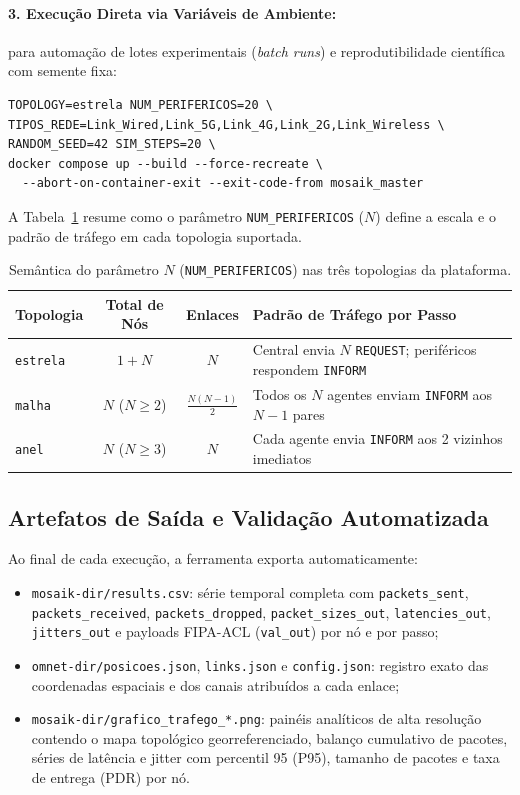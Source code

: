 \documentclass[10pt,twocolumn,a4paper]{article}
\begin{document}
\paragraph{3. Execução Direta via Variáveis de Ambiente:} para automação de lotes experimentais (\textit{batch runs}) e reprodutibilidade científica com semente fixa:
\begin{lstlisting}[style=shellstyle]
TOPOLOGY=estrela NUM_PERIFERICOS=20 \
TIPOS_REDE=Link_Wired,Link_5G,Link_4G,Link_2G,Link_Wireless \
RANDOM_SEED=42 SIM_STEPS=20 \
docker compose up --build --force-recreate \
  --abort-on-container-exit --exit-code-from mosaik_master
\end{lstlisting}

A Tabela~\ref{tab:semantica_topologias} resume como o parâmetro \texttt{NUM\_PERIFERICOS} ($N$) define a escala e o padrão de tráfego em cada topologia suportada.

\begin{table}[H]
\centering
\caption{Semântica do parâmetro $N$ (\texttt{NUM\_PERIFERICOS}) nas três topologias da plataforma.}
\label{tab:semantica_topologias}
\scriptsize
\begin{tabularx}{\columnwidth}{@{}lccp{3.3cm}@{}}
\toprule
\textbf{Topologia} & \textbf{Total de Nós} & \textbf{Enlaces} & \textbf{Padrão de Tráfego por Passo} \\
\midrule
\texttt{estrela} & $1 + N$ & $N$ & Central envia $N$ \texttt{REQUEST}; periféricos respondem \texttt{INFORM} \\
\texttt{malha} & $N$ ($N\ge 2$) & $\frac{N(N-1)}{2}$ & Todos os $N$ agentes enviam \texttt{INFORM} aos $N-1$ pares \\
\texttt{anel} & $N$ ($N\ge 3$) & $N$ & Cada agente envia \texttt{INFORM} aos 2 vizinhos imediatos \\
\bottomrule
\end{tabularx}
\end{table}

\subsection{Artefatos de Saída e Validação Automatizada}

Ao final de cada execução, a ferramenta exporta automaticamente:
\begin{itemize}
    \item \texttt{mosaik-dir/results.csv}: série temporal completa com \texttt{packets\_sent}, \texttt{packets\_received}, \texttt{packets\_dropped}, \texttt{packet\_sizes\_out}, \texttt{latencies\_out}, \texttt{jitters\_out} e payloads FIPA-ACL (\texttt{val\_out}) por nó e por passo;
    \item \texttt{omnet-dir/posicoes.json}, \texttt{links.json} e \texttt{config.json}: registro exato das coordenadas espaciais e dos canais atribuídos a cada enlace;
    \item \texttt{mosaik-dir/grafico\_trafego\_*.png}: painéis analíticos de alta resolução contendo o mapa topológico georreferenciado, balanço cumulativo de pacotes, séries de latência e jitter com percentil 95 (P95), tamanho de pacotes e taxa de entrega (PDR) por nó.
\end{itemize}
\end{document}
